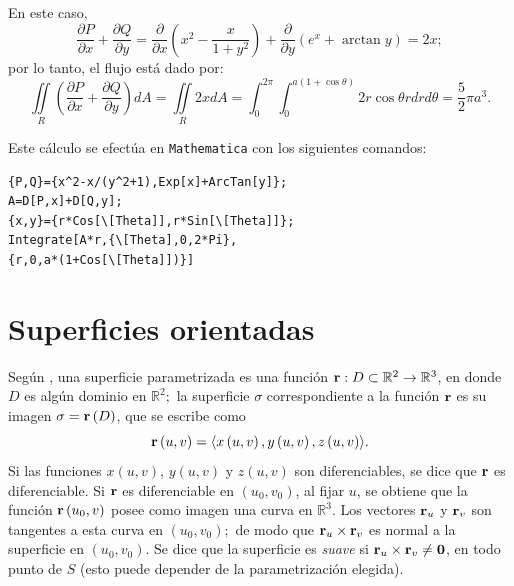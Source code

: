 \begin{ejemplo}
En este caso,
\[\frac{\partial P}{\partial x}+\frac{\partial Q}{\partial y}=\frac{\partial }{\partial x}\left( x^{2}-\frac{x}{1+y^{2}}\right) +\frac{\partial }{\partial y}\left( e^{x}+\arctan y\right) = 2x;\]
por lo tanto, el flujo está dado por:
\[\iint\limits_{R}\left( \frac{\partial P}{\partial x}+\frac{\partial Q}{\partial y}\right) dA=\iint\limits_{R}2xdA=\int_{0}^{2\pi}\int_{0}^{a(1+\cos \theta )} 2r\cos \theta  rdrd\theta= \frac{5}{2}\pi a^{3}.\]

\end{ejemplo}
Este cálculo se efectúa en \verb"Mathematica" con los siguientes comandos:

\begin{tcolorbox}[title=\bf Instrucción \verb"Mathematica"]\begin{Verbatim}[formatcom=\letraverbatim]
{P,Q}={x^2-x/(y^2+1),Exp[x]+ArcTan[y]};
A=D[P,x]+D[Q,y];
{x,y}={r*Cos[\[Theta]],r*Sin[\[Theta]]};
Integrate[A*r,{\[Theta],0,2*Pi},
{r,0,a*(1+Cos[\[Theta]])}]
\end{Verbatim}
\end{tcolorbox}

\section{Superficies orientadas}

Según \textcite{marsden_calculo_2013}, una superficie parametrizada es una función ${\bf r}:D\subset \mathbb{R}^{2}\rightarrow \mathbb{R}^{3}$, en donde $D$ es algún dominio en $\mathbb{R}^{2};$ la superficie $\sigma $ correspondiente a la función ${\bf r}$ es su imagen $\sigma ={\bf r}\left( D\right) $, que se escribe como
\[{\bf r}\left( u,v\right) =\left\langle x\left( u,v\right) ,y\left( u,v\right),z\left( u,v\right) \right\rangle\!.\]
Si las funciones $x(u,v) $, $y(u,v) $ y $z(u,v)$ son diferenciables, se dice que ${\bf r}$ es diferenciable. Si ${\bf r}$ es diferenciable en $\left( u_{0},v_{0}\right) $, al fijar $u$, se obtiene que la función ${\bf r}\left( u_{0},v\right) $ posee como imagen una curva en $\mathbb{R}^{3}$.
Los vectores ${\bf r}_{u}$ y ${\bf r}_{v}$ son tangentes a esta curva en $\left(u_{0},v_{0}\right) ;$
de modo que ${\bf r}_{u}\times {\bf r}_{v}$ es normal a la superficie en $\left( u_{0},v_{0}\right) $.
Se dice que la superficie es \emph{suave}  si ${\bf r}_{u}\times {\bf r}_{v}\neq {\bf 0}$, en todo punto de $S$ (esto puede depender de la parametrización elegida).

